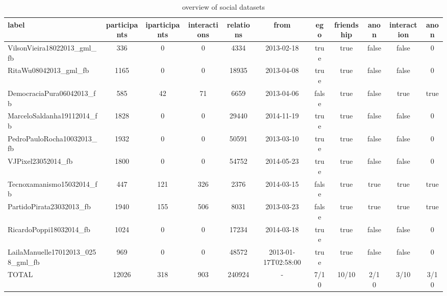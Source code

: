 \begin{table*}[h!]
\begin{center}
\begin{tabular}{| l | c | c | c | c | c | c | c | c | c | c |}\hline
label & participants & iparticipants & interactions & relations & from & ego & friendship & anon & interaction & anon \\\hline
VilsonVieira18022013\_gml\_fb & 336  & 0  & 0  & 4334  & 2013-02-18  & true  & true  & false  & false  & 0 \\\hline
RitaWu08042013\_gml\_fb & 1165  & 0  & 0  & 18935  & 2013-04-08  & true  & true  & false  & false  & 0 \\\hline
DemocraciaPura06042013\_fb & 585  & 42  & 71  & 6659  & 2013-04-06  & false  & true  & false  & true  & true \\\hline
MarceloSaldanha19112014\_fb & 1828  & 0  & 0  & 29440  & 2014-11-19  & true  & true  & false  & false  & 0 \\\hline
PedroPauloRocha10032013\_fb & 1932  & 0  & 0  & 50591  & 2013-03-10  & true  & true  & false  & false  & 0 \\\hline
VJPixel23052014\_fb & 1800  & 0  & 0  & 54752  & 2014-05-23  & true  & true  & false  & false  & 0 \\\hline
Tecnoxamanismo15032014\_fb & 447  & 121  & 326  & 2376  & 2014-03-15  & false  & true  & true  & true  & true \\\hline
PartidoPirata23032013\_fb & 1940  & 155  & 506  & 8031  & 2013-03-23  & false  & true  & true  & true  & true \\\hline
RicardoPoppi18032014\_fb & 1024  & 0  & 0  & 17234  & 2014-03-18  & true  & true  & false  & false  & 0 \\\hline
LailaManuelle17012013\_0258\_gml\_fb & 969  & 0  & 0  & 48572  & 2013-01-17T02:58:00  & true  & true  & false  & false  & 0 \\\hline
TOTAL & 12026  & 318  & 903  & 240924  & -  & 7/10  & 10/10  & 2/10  & 3/10  & 3/10 \\\hline
\end{tabular}
\caption{overview of social datasets}
\end{center}
\end{table*}